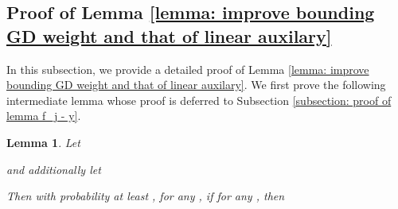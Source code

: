 \documentclass{article} \usepackage{iclr2023/iclr2023_conference,times}
\newtheorem{lemma}{Lemma}[section]
\begin{document}
\subsection{Proof of Lemma \ref{lemma: improve bounding GD weight and that of linear auxilary}}
In this subsection, we provide a detailed proof of Lemma \ref{lemma: improve bounding GD weight and that of linear auxilary}. We first prove the following intermediate lemma whose proof is deferred to Subsection \ref{subsection: proof of lemma f_j - y}. 

\begin{lemma}
Let 

 and additionally let 

Then with probability at least , for any , if  for any , then 

\label{lemmaq: improved bound f_j - y}
\end{lemma}
\end{document}
